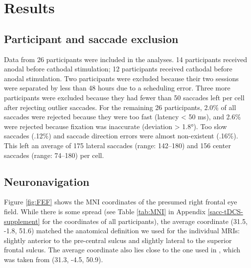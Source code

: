 \documentclass[11pt,]{memoir}
\begin{document}
\hypertarget{sacc_tDCS-results}{%
\section{Results}\label{sacc_tDCS-results}}

\hypertarget{participant-and-saccade-exclusion}{%
\subsection{Participant and saccade exclusion}\label{participant-and-saccade-exclusion}}

Data from 26 participants were included in the analyses. 14 participants received anodal before cathodal stimulation; 12 participants received cathodal before anodal stimulation. Two participants were excluded because their two sessions were separated by less than 48 hours due to a scheduling error. Three more participants were excluded because they had fewer than 50 saccades left per cell after rejecting outlier saccades. For the remaining 26 participants, 2.0\% of all saccades were rejected because they were too fast (latency \textless{} 50 ms), and 2.6\% were rejected because fixation was inaccurate (deviation \textgreater{} 1.8°). Too slow saccades (.12\%) and saccade direction errors were almost non-existent (.16\%). This left an average of 175 lateral saccades (range: 142--180) and 156 center saccades (range: 74--180) per cell.

\hypertarget{neuronavigation}{%
\subsection{Neuronavigation}\label{neuronavigation}}

Figure \ref{fig:FEF} shows the MNI coordinates of the presumed right frontal eye field. While there is some spread (see Table \ref{tab:MNI} in Appendix \ref{sacc-tDCS-supplement} for the coordinates of all participants), the average coordinate (31.5, -1.8, 51.6) matched the anatomical definition we used for the individual MRIs: slightly anterior to the pre-central sulcus and slightly lateral to the superior frontal sulcus. The average coordinate also lies close to the one used in \textcite{Kanai2012}, which was taken from \textcite{Paus1996} (31.3, -4.5, 50.9).
\end{document}
